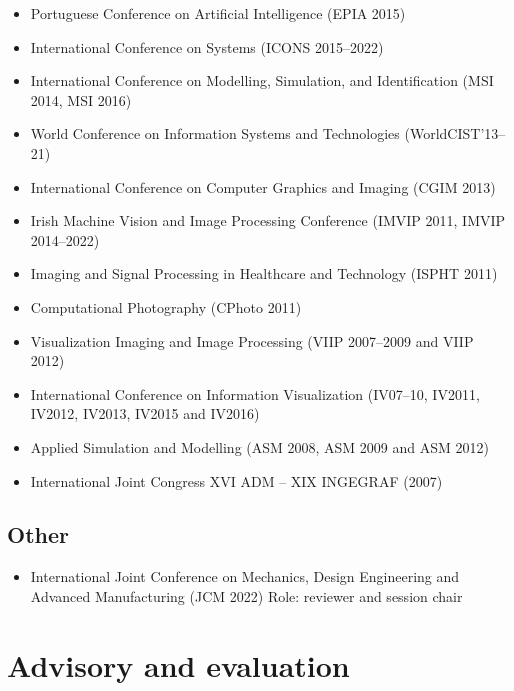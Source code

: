 \documentclass[11pt]{article}
\begin{document}
\begin{itemize}
  \item Portuguese Conference on Artificial Intelligence (EPIA 2015)
  \item International Conference on Systems (ICONS 2015--2022)
  \item International Conference on Modelling, Simulation, and Identification (MSI 2014, MSI 2016)
  \item World Conference on Information Systems and Technologies (WorldCIST'13--21)
  \item International Conference on Computer Graphics and Imaging (CGIM 2013)
  \item Irish Machine Vision and Image Processing Conference (IMVIP 2011, IMVIP 2014--2022)
  \item Imaging and Signal Processing in Healthcare and Technology (ISPHT 2011)
  \item Computational Photography (CPhoto 2011)
  \item Visualization Imaging and Image Processing (VIIP 2007--2009 and VIIP 2012) 
  \item International Conference on Information Visualization (IV07--10, IV2011, IV2012, IV2013, IV2015 and IV2016)
  \item Applied Simulation and Modelling (ASM 2008, ASM 2009 and ASM 2012)
  \item International Joint Congress XVI ADM -- XIX INGEGRAF (2007)
\end{itemize}

\subsection*{Other}
\begin{itemize}
	\item International Joint Conference on Mechanics, Design Engineering and Advanced Manufacturing (JCM 2022) \hfill Role: reviewer and session chair
\end{itemize} 

\section*{Advisory and evaluation}
\end{document}
